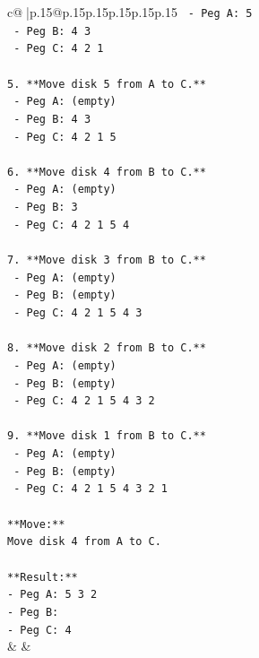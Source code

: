 \documentclass{article}
\begin{document}
{\begin{supertabular}{c@{$\;$}|p{.15\linewidth}@{}p{.15\linewidth}p{.15\linewidth}p{.15\linewidth}p{.15\linewidth}p{.15\linewidth}}
{{{\texttt{   {-} Peg A: 5} \\
\texttt{   {-} Peg B: 4 3} \\
\texttt{   {-} Peg C: 4 2 1} \\
\\ 
\texttt{5. **Move disk 5 from A to C.**} \\
\texttt{   {-} Peg A: (empty)} \\
\texttt{   {-} Peg B: 4 3} \\
\texttt{   {-} Peg C: 4 2 1 5} \\
\\ 
\texttt{6. **Move disk 4 from B to C.**} \\
\texttt{   {-} Peg A: (empty)} \\
\texttt{   {-} Peg B: 3} \\
\texttt{   {-} Peg C: 4 2 1 5 4} \\
\\ 
\texttt{7. **Move disk 3 from B to C.**} \\
\texttt{   {-} Peg A: (empty)} \\
\texttt{   {-} Peg B: (empty)} \\
\texttt{   {-} Peg C: 4 2 1 5 4 3} \\
\\ 
\texttt{8. **Move disk 2 from B to C.**} \\
\texttt{   {-} Peg A: (empty)} \\
\texttt{   {-} Peg B: (empty)} \\
\texttt{   {-} Peg C: 4 2 1 5 4 3 2} \\
\\ 
\texttt{9. **Move disk 1 from B to C.**} \\
\texttt{   {-} Peg A: (empty)} \\
\texttt{   {-} Peg B: (empty)} \\
\texttt{   {-} Peg C: 4 2 1 5 4 3 2 1} \\
\\ 
\texttt{**Move:**} \\
\texttt{Move disk 4 from A to C.} \\
\\ 
\texttt{**Result:**} \\
\texttt{{-} Peg A: 5 3 2} \\
\texttt{{-} Peg B:} \\
\texttt{{-} Peg C: 4} \\
            }
        }
    }
    & & \\ \\


\end{supertabular}}
\end{document}
